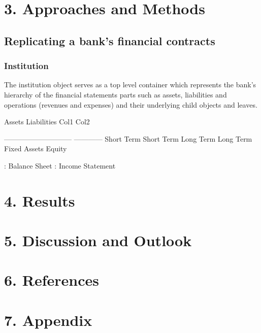\documentclass[
  12pt,
]{article}
\begin{document}
\newpage

\hypertarget{approaches-and-methods}{%
\section{3. Approaches and Methods}\label{approaches-and-methods}}

\hypertarget{replicating-a-banks-financial-contracts}{%
\subsection{Replicating a bank's financial
contracts}\label{replicating-a-banks-financial-contracts}}

\hypertarget{institution}{%
\subsubsection{Institution}\label{institution}}

The institution object serves as a top level container which represents
the bank's hierarchy of the financial statements parts such as assets,
liabilities and operations (revenues and expenses) and their underlying
child objects and leaves.

Assets \textbar{} Liabilities \textbar{} \textbar{} Col1 \textbar{} Col2
\textbar{}

\textbar---------------\textbar--------------\textbar{}
\textbar------\textbar------\textbar{} \textbar{} Short Term \textbar{}
Short Term \textbar{} \textbar{} \textbar{} \textbar{} \textbar{} Long
Term \textbar{} Long Term \textbar{} \textbar{} \textbar{} \textbar{}
\textbar{} Fixed Assets \textbar{} Equity \textbar{} \textbar{}
\textbar{} \textbar{}

: Balance Sheet : Income Statement

\newpage

\hypertarget{results}{%
\section{4. Results}\label{results}}

\newpage

\hypertarget{discussion-and-outlook}{%
\section{5. Discussion and Outlook}\label{discussion-and-outlook}}

\newpage

\hypertarget{references}{%
\section{6. References}\label{references}}

\newpage

\hypertarget{appendix}{%
\section{7. Appendix}\label{appendix}}
\end{document}

